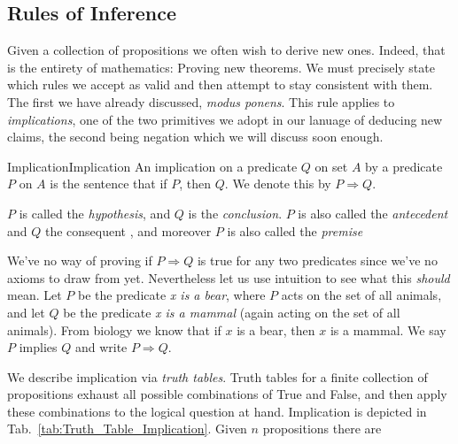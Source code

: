     \subsection{Rules of Inference}
        Given a collection of propositions we often wish to derive new ones.
        Indeed, that is the entirety of mathematics: Proving new theorems. We
        must precisely state which rules we accept as valid and then attempt to
        stay consistent with them. The first we have already discussed,
        \textit{modus ponens}. This rule applies to \textit{implications}, one
        of the two primitives we adopt in our lanuage of deducing new claims,
        the second being negation which we will discuss soon enough.
        \begin{fdefinition}{Implication}{Implication}
            An \gls{implication} on a \gls{predicate} $Q$ on \gls{set} $A$ by a
            predicate $P$ on $A$ is the sentence that if $P$, then $Q$. We
            denote this by $P\Rightarrow{Q}$.
        \end{fdefinition}
        $P$ is called the \textit{hypothesis}, and $Q$ is the
        \textit{conclusion}. $P$ is also called the
        \textit{antecedent} and $Q$ the consequent%
        , and moreover $P$ is also called the
        \textit{premise}
        \begin{example}
            \label{ex:Implication_Mammals}%
            We've no way of proving if $P\Rightarrow{Q}$ is true for any two
            predicates since we've no axioms to draw from yet. Nevertheless let
            us use intuition to see what this \textit{should} mean. Let $P$ be
            the predicate \textit{x is a bear}, where $P$ acts on the set
            of all animals, and let $Q$ be the predicate \textit{x is a mammal}
            (again acting on the set of all animals). From biology we know that
            if $x$ is a bear, then $x$ is a mammal. We say $P$ implies $Q$ and
            write $P\Rightarrow{Q}$.
        \end{example}
        We describe implication via \textit{truth tables}.
        Truth tables for a finite collection of propositions exhaust all
        possible combinations of True and False, and then apply these
        combinations to the logical question at hand. Implication is depicted in
        Tab.~\ref{tab:Truth_Table_Implication}. Given $n$ propositions there are
